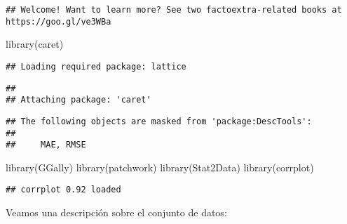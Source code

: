 \documentclass[
]{article}
\newenvironment{Shaded}{\begin{snugshade}}{\end{snugshade}}
\newcommand{\FunctionTok}[1]{\textcolor[rgb]{0.00,0.00,0.00}{#1}}
\newcommand{\NormalTok}[1]{#1}
\begin{document}
\begin{verbatim}
## Welcome! Want to learn more? See two factoextra-related books at https://goo.gl/ve3WBa
\end{verbatim}

\begin{Shaded}
\begin{Highlighting}[]
\FunctionTok{library}\NormalTok{(caret)}
\end{Highlighting}
\end{Shaded}

\begin{verbatim}
## Loading required package: lattice
\end{verbatim}

\begin{verbatim}
## 
## Attaching package: 'caret'
\end{verbatim}

\begin{verbatim}
## The following objects are masked from 'package:DescTools':
## 
##     MAE, RMSE
\end{verbatim}

\begin{Shaded}
\begin{Highlighting}[]
\FunctionTok{library}\NormalTok{(GGally)}
\FunctionTok{library}\NormalTok{(patchwork)}
\FunctionTok{library}\NormalTok{(Stat2Data)}
\FunctionTok{library}\NormalTok{(corrplot)}
\end{Highlighting}
\end{Shaded}

\begin{verbatim}
## corrplot 0.92 loaded
\end{verbatim}

Veamos una descripción sobre el conjunto de datos:
\end{document}
